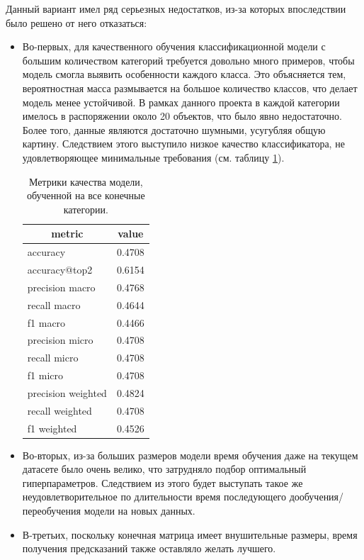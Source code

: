 \documentclass[a4paper,12pt]{extarticle}
\begin{document}
Данный вариант имел ряд серьезных недостатков, из-за которых впоследствии было решено от него отказаться:
\begin{itemize}
	\item Во-первых, для качественного обучения классификационной модели с большим количеством категорий требуется довольно много примеров, чтобы модель смогла выявить особенности каждого класса. Это объясняется тем, вероятностная масса размывается на большое количество классов, что делает модель менее устойчивой. В рамках данного проекта в каждой категории имелось в распоряжении около 20 объектов, что было явно недостаточно. Более того, данные являются достаточно шумными, усугубляя общую картину. Следствием этого выступило низкое качество классификатора, не удовлетворяющее минимальные требования (см. таблицу \ref{table:metrics_all}).
	
	\begin{table}[ht]
		\caption{Метрики качества модели, обученной на все конечные категории.}
		\label{table:metrics_all}
		\footnotesize
		\centering
		\begin{tabular}{l|l}
			\toprule
			\multicolumn{1}{c|}{metric} & \multicolumn{1}{c}{value}\\
			\midrule
			accuracy           & 0.4708\\
			accuracy@top2      & 0.6154\\
			precision macro    & 0.4768\\
			recall macro       & 0.4644\\
			f1 macro           & 0.4466\\
			precision micro    & 0.4708\\
			recall micro       & 0.4708\\
			f1 micro           & 0.4708\\
			precision weighted & 0.4824\\
			recall weighted    & 0.4708\\
			f1 weighted        & 0.4526\\
			\bottomrule
		\end{tabular}
	\end{table}
	
	\item Во-вторых, из-за больших размеров модели время обучения даже на текущем датасете было очень велико, что затрудняло подбор оптимальный гиперпараметров. Следствием из этого будет выступать такое же неудовлетворительное по длительности время последующего дообучения/переобучения модели на новых данных.
	\item В-третьих, поскольку конечная матрица имеет внушительные размеры, время получения предсказаний также оставляло желать лучшего.
\end{itemize}
\end{document}
